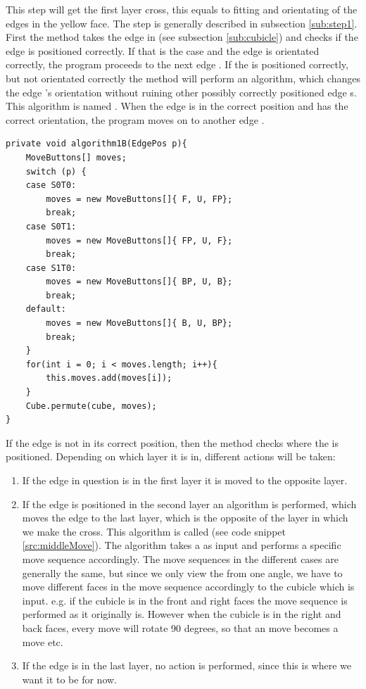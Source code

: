 This step will get the first layer cross, this equals to fitting and orientating of the edges in the yellow face. 
The step is generally described in subsection \ref{sub:step1}.
First the method takes the edge \cubie{} in \cubicle{}  (see subsection \ref{sub:cubicle}) 
and checks if the edge \cpiece{} is positioned correctly.
If that is the case and the edge \cpiece{} is orientated correctly, the program proceeds to the next edge \cpiece{}.
If the \cubicle{} is positioned correctly, but not orientated correctly the method will perform an algorithm, which changes the edge \cpiece{}'s orientation without ruining other possibly correctly positioned edge \cpiece{}s. 
This algorithm is named . When the edge \cpiece{} is in the correct position and has the correct orientation, the program moves on to another edge \cpiece{}. 

\begin{lstlisting}[style=sourceCode, caption=\myCaption{This is algorithm 1B, which will move an edge piece from the middle layer to the top layer without ruining any edge pieces which are correctly positioned in the cross.}, label=src:middleMove, float=htb]
private void algorithm1B(EdgePos p){
	MoveButtons[] moves;
	switch (p) {
	case S0T0:
		moves = new MoveButtons[]{ F, U, FP};
		break;
	case S0T1:
		moves = new MoveButtons[]{ FP, U, F};
		break;
	case S1T0:
		moves = new MoveButtons[]{ BP, U, B};
		break;
	default:
		moves = new MoveButtons[]{ B, U, BP};
		break;
	}
	for(int i = 0; i < moves.length; i++){
		this.moves.add(moves[i]);
	}
	Cube.permute(cube, moves);
}
\end{lstlisting}

If the edge \cpiece{} is not in its correct position, then the method checks where the \cpiece{} is positioned. 
Depending on which layer it is in, different actions will be taken:
\begin{enumerate}
	\item If the edge \cpiece{} in question is in the first layer it is moved to the opposite layer.
	\item If the edge \cpiece{} is positioned in the second layer an algorithm is performed, which moves the edge \cpiece{} to the last layer, which is the opposite of the layer in which we make the cross. This algorithm is called  (see code snippet \ref{src:middleMove}). 
	The algorithm takes a \cubicle{} as input and performs a specific move sequence accordingly.
	The move sequences in the different cases are generally the same, but since we only view the \rubik{} from one angle, we have to move different faces in the move sequence accordingly to the cubicle which is input. e.g. if the cubicle is in the front and right faces the move sequence is performed as it originally is. 
	However when the cubicle is in the right and back faces, every move will rotate 90 degrees, so that an  move becomes a  move etc.
	\item If the edge \cubie{} is in the last layer, no action is performed, since this is where we want it to be for now.
\end{enumerate}

